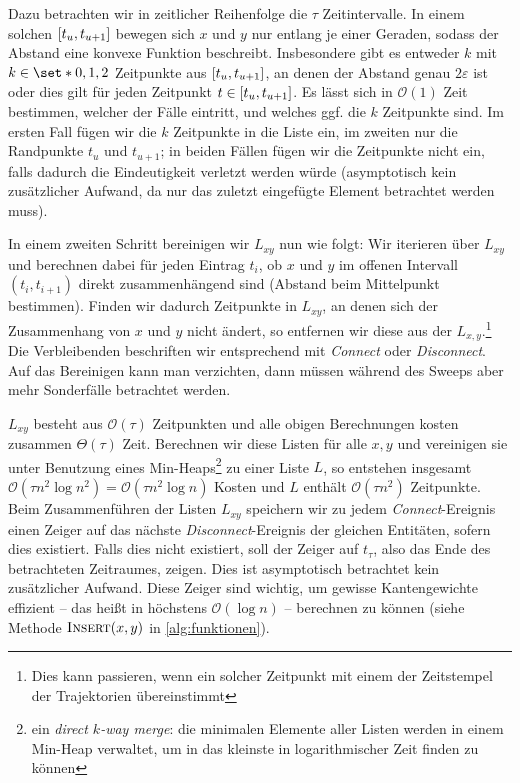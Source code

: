 Dazu betrachten wir in zeitlicher Reihenfolge die $\tau$ Zeitintervalle.
In einem solchen $\benbrace*{t_u,t_{u+1}}$ bewegen sich $x$ und $y$ nur entlang je einer Geraden, sodass der Abstand eine konvexe Funktion beschreibt.
Insbesondere gibt es entweder $k$ mit $k \in \set*{0,1,2}$ Zeitpunkte aus $\benbrace*{t_u,t_{u+1}}$, an denen der Abstand genau $2 \varepsilon$ ist oder dies gilt für jeden Zeitpunkt $t \in \benbrace*{t_u,t_{u+1}}$.
Es lässt sich in $\mathcal{O}(1)$ Zeit bestimmen, welcher der Fälle eintritt, und welches ggf. die $k$ Zeitpunkte sind.
Im ersten Fall fügen wir die $k$ Zeitpunkte in die Liste ein, im zweiten nur die Randpunkte $t_u$ und $t_{u+1}$; in beiden Fällen fügen wir die Zeitpunkte nicht ein, falls dadurch die Eindeutigkeit verletzt werden würde (asymptotisch kein zusätzlicher Aufwand, da nur das zuletzt eingefügte Element betrachtet werden muss).

In einem zweiten Schritt bereinigen wir $L_{xy}$ nun wie folgt: Wir iterieren über $L_{xy}$ und berechnen dabei für jeden Eintrag $t_i$, ob $x$ und $y$ im offenen Intervall $(t_i,t_{i+1})$ direkt zusammenhängend sind (Abstand beim Mittelpunkt bestimmen).
Finden wir dadurch Zeitpunkte in $L_{xy}$, an denen sich der Zusammenhang von $x$ und $y$ nicht ändert, so entfernen wir diese aus der $L_{x,y}$.\footnote{Dies kann passieren, wenn ein solcher Zeitpunkt mit einem der Zeitstempel der Trajektorien übereinstimmt}
Die Verbleibenden beschriften wir entsprechend mit \emph{Connect} oder \emph{Disconnect}.
Auf das Bereinigen kann man verzichten, dann müssen während des Sweeps aber mehr Sonderfälle betrachtet werden.

$L_{xy}$ besteht aus $\mathcal{O}(\tau)$ Zeitpunkten und alle obigen Berechnungen kosten zusammen $\Theta(\tau)$ Zeit.
Berechnen wir diese Listen für alle $x,y$ und vereinigen sie unter Benutzung eines Min-Heaps\footnote{ein \emph{direct $k$-way merge}: die minimalen Elemente aller Listen werden in einem Min-Heap verwaltet, um in das kleinste in logarithmischer Zeit finden zu können} zu einer Liste $L$, so entstehen insgesamt $\mathcal{O}(\tau n^2 \log n^2) = \mathcal{O}(\tau n^2 \log n)$ Kosten und $L$ enthält $\mathcal{O}(\tau n^2)$ Zeitpunkte.
Beim Zusammenführen der Listen $L_{xy}$ speichern wir zu jedem \emph{Connect}-Ereignis einen Zeiger auf das nächste \emph{Disconnect}-Ereignis der gleichen Entitäten, sofern dies existiert.
Falls dies nicht existiert, soll der Zeiger auf $t_\tau$, also das Ende des betrachteten Zeitraumes, zeigen.
Dies ist asymptotisch betrachtet kein zusätzlicher Aufwand.
Diese Zeiger sind wichtig, um gewisse Kantengewichte effizient -- das heißt in höchstens $\mathcal{O}(\log n)$ -- berechnen zu können (siehe Methode $\textsc{Insert}(x,y)$ in \cref{alg:funktionen}).

